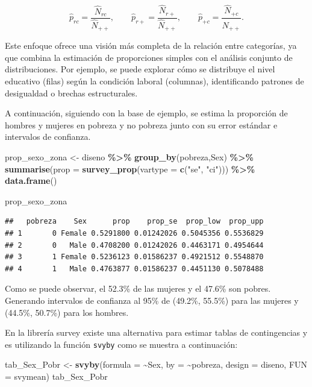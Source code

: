 \documentclass[
  12pt,
]{book}
\newenvironment{Shaded}{\begin{snugshade}}{\end{snugshade}}
\newcommand{\AttributeTok}[1]{\textcolor[rgb]{0.13,0.29,0.53}{#1}}
\newcommand{\FunctionTok}[1]{\textcolor[rgb]{0.13,0.29,0.53}{\textbf{#1}}}
\newcommand{\NormalTok}[1]{#1}
\newcommand{\OtherTok}[1]{\textcolor[rgb]{0.56,0.35,0.01}{#1}}
\newcommand{\SpecialCharTok}[1]{\textcolor[rgb]{0.81,0.36,0.00}{\textbf{#1}}}
\newcommand{\StringTok}[1]{\textcolor[rgb]{0.31,0.60,0.02}{#1}}
\begin{document}
\[
\hat{p}_{rc} = \frac{\hat{N}_{rc}}{\hat{N}_{++}}, \qquad 
\hat{p}_{r+} = \frac{\hat{N}_{r+}}{\hat{N}_{++}}, \qquad 
\hat{p}_{+c} = \frac{\hat{N}_{+c}}{\hat{N}_{++}}.
\]

Este enfoque ofrece una visión más completa de la relación entre categorías, ya que combina la estimación de proporciones simples con el análisis conjunto de distribuciones. Por ejemplo, se puede explorar cómo se distribuye el nivel educativo (filas) según la condición laboral (columnas), identificando patrones de desigualdad o brechas estructurales.

A continuación, siguiendo con la base de ejemplo, se estima la proporción de hombres y mujeres en pobreza y no pobreza junto con su error estándar e intervalos de confianza.

\begin{Shaded}
\begin{Highlighting}[]
\NormalTok{prop\_sexo\_zona }\OtherTok{\textless{}{-}}\NormalTok{ diseno }\SpecialCharTok{\%\textgreater{}\%} 
                  \FunctionTok{group\_by}\NormalTok{(pobreza,Sex) }\SpecialCharTok{\%\textgreater{}\%}
                  \FunctionTok{summarise}\NormalTok{(}\AttributeTok{prop =} \FunctionTok{survey\_prop}\NormalTok{(}\AttributeTok{vartype =} \FunctionTok{c}\NormalTok{(}\StringTok{"se"}\NormalTok{, }\StringTok{"ci"}\NormalTok{))) }\SpecialCharTok{\%\textgreater{}\%} 
                  \FunctionTok{data.frame}\NormalTok{()}

\NormalTok{prop\_sexo\_zona}
\end{Highlighting}
\end{Shaded}

\begin{verbatim}
##   pobreza    Sex      prop    prop_se  prop_low  prop_upp
## 1       0 Female 0.5291800 0.01242026 0.5045356 0.5536829
## 2       0   Male 0.4708200 0.01242026 0.4463171 0.4954644
## 3       1 Female 0.5236123 0.01586237 0.4921512 0.5548870
## 4       1   Male 0.4763877 0.01586237 0.4451130 0.5078488
\end{verbatim}

Como se puede observar, el 52.3\% de las mujeres y el 47.6\% son pobres. Generando intervalos de confianza al 95\% de (49.2\%, 55.5\%) para las mujeres y (44.5\%, 50.7\%) para los hombres.

En la librería survey existe una alternativa para estimar tablas de contingencias y es utilizando la función \texttt{svyby} como se muestra a continuación:

\begin{Shaded}
\begin{Highlighting}[]
\NormalTok{tab\_Sex\_Pobr }\OtherTok{\textless{}{-}} \FunctionTok{svyby}\NormalTok{(}\AttributeTok{formula =} \SpecialCharTok{\textasciitilde{}}\NormalTok{Sex, }\AttributeTok{by =}  \SpecialCharTok{\textasciitilde{}}\NormalTok{pobreza, }\AttributeTok{design =}\NormalTok{ diseno, }\AttributeTok{FUN =}\NormalTok{ svymean)}
\NormalTok{tab\_Sex\_Pobr}
\end{Highlighting}
\end{Shaded}
\end{document}
